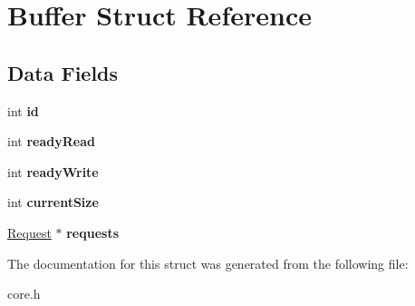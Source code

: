\hypertarget{struct_buffer}{\section{Buffer Struct Reference}
\label{struct_buffer}
}
\subsection*{Data Fields}
\begin{DoxyCompactItemize}
\item 
\hypertarget{struct_buffer_a7441ef0865bcb3db9b8064dd7375c1ea}{int {\bfseries id}}\label{struct_buffer_a7441ef0865bcb3db9b8064dd7375c1ea}

\item 
\hypertarget{struct_buffer_a637e49c90b3423cfb2f0b99fecc1b4c3}{int {\bfseries ready\-Read}}\label{struct_buffer_a637e49c90b3423cfb2f0b99fecc1b4c3}

\item 
\hypertarget{struct_buffer_aef94d326fece379f1cc2bfdbc297f448}{int {\bfseries ready\-Write}}\label{struct_buffer_aef94d326fece379f1cc2bfdbc297f448}

\item 
\hypertarget{struct_buffer_a0c2f9a0a6941e32677f17cadd8626c6f}{int {\bfseries current\-Size}}\label{struct_buffer_a0c2f9a0a6941e32677f17cadd8626c6f}

\item 
\hypertarget{struct_buffer_a9eaf7c28985896889d16ff7e5b43da32}{\hyperlink{struct_request}{Request} $\ast$ {\bfseries requests}}\label{struct_buffer_a9eaf7c28985896889d16ff7e5b43da32}

\end{DoxyCompactItemize}


The documentation for this struct was generated from the following file\-:\begin{DoxyCompactItemize}
\item 
core.\-h\end{DoxyCompactItemize}
